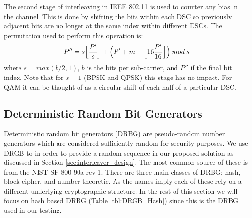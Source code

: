 \documentclass[sigconf]{acmart}
\begin{document}
The second stage of interleaving in IEEE 802.11 is used to counter any bias in the channel. This is done by shifting the bits within each DSC so previously adjacent bits are no longer at the same index within different DSCs. The permutation used to perform this operation is:
$$P''= s \Bigl\lfloor \frac{P'}{s} \Bigr\rfloor + \Bigl(P' + m - \Bigl\lfloor 16 \frac{P'}{16} \Bigr\rfloor \Bigr)\: mod \: s$$
where $s=max(b/2, 1)$, $b$ is the bits per sub-carrier, and $P''$ if the final bit index. Note that for $s=1$ (BPSK and QPSK) this stage has no impact. For QAM it can be thought of as a circular shift of each half of a particular DSC. 

\subsection{Deterministic Random Bit Generators}

Deterministic random bit generators (DRBG) are pseudo-random number generators which are considered sufficiently random for security purposes. We use DRGB to in order to provide a random sequence in our proposed solution as discussed in Section \ref{sec:interleaver_design}. The most common source of these is from the NIST SP 800-90a rev 1\cite{barker2015nist90a}. There are three main classes of DRBG: hash, block-cipher, and number theoretic. As the names imply each of these rely on a different underlying cryptographic structure. In the rest of this section we will focus on hash based DRBG (Table \ref{tbl:DRGB_Hash}) since this is the DRBG used in our testing. 

\end{document}

